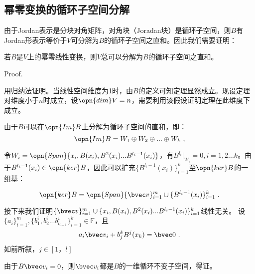 \subsection{幂零变换的循环子空间分解}

由于Jordan表示是分块对角矩阵，对角块（Joradan块）是循环子空间，则$B$有Jordan形表示等价于$V$可分解为$B$的循环子空间之直和。因此我们需要证明：

\begin{theorem}{}
若$B$是$V$上的幂零线性变换，则$V$总可以分解为$B$的循环子空间之直和。
\end{theorem}
Proof.

用归纳法证明。当线性空间维度为1时，由$B$的定义可知定理显然成立。现设定理对维度小于$n$时成立，设$\opn{dim}V=n$，需要利用该假设证明定理在此维度下成立。

由于$B$可以在$\opn{Im}B$上分解为循环子空间的直和，即：
\begin{equation}
\opn{Im}B=W_1\oplus W_2\oplus...\oplus W_k~,
\end{equation}

令$W_i=\opn{Span}\{x_i,B(x_i),B^2(x_i)...B^{l_i-1}(x_i)\}$，有$B^{l_i}|_{W_i}=0,i=1,2...k$。由于$B^{l_i-1}(x_i)\in \opn{ker}B$，因此可以扩充$\{B^{l_i-1}(x_i)\}^k_{i=1}$至$\opn{ker}B$的一组基：

\begin{equation}
\opn{ker}B=\opn{Span}\{\bvec v\}^m_{i=1}\cup \{B^{l_i-1}(x_i)\}^k_{i=1}~.
\end{equation}

接下来我们证明$\{\bvec v\}^m_{i=1}\cup \{x_i,B(x_i),B^2(x_i)...B^{l_i-1}(x_i)\}^{k}_{i=1}$线性无关。
设$\{a_i\}^m_{i=1},\{b^i_1,b^i_2...b^i_{l_{i-1}}\}^{k}_{i=1}\in\mathbb F$，且
\begin{equation}
a_i\bvec v_i+b^k_jB^{j}(x_k)=\bvec 0~.
\end{equation}
如前所叙，$j\in[1，l_{}]$


由于$B\bvec v_i=0$，则$\bvec v_i$都是$B$的一维循环不变子空间，得证。



